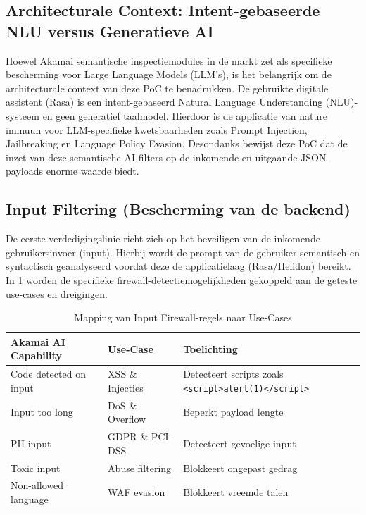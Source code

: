 \subsection{Architecturale Context: Intent-gebaseerde NLU versus Generatieve AI}

Hoewel Akamai semantische inspectiemodules in de markt zet als specifieke bescherming voor Large Language Models (LLM's), is het belangrijk om de architecturale context van deze PoC te benadrukken. De gebruikte digitale assistent (Rasa) is een intent-gebaseerd Natural Language Understanding (NLU)-systeem en geen generatief taalmodel. Hierdoor is de applicatie van nature immuun voor LLM-specifieke kwetsbaarheden zoals Prompt Injection, Jailbreaking en Language Policy Evasion. Desondanks bewijst deze PoC dat de inzet van deze semantische AI-filters op de inkomende en uitgaande JSON-payloads enorme waarde biedt.

\subsection{Input Filtering (Bescherming van de backend)}

De eerste verdedigingslinie richt zich op het beveiligen van de inkomende gebruikersinvoer (input). Hierbij wordt de prompt van de gebruiker semantisch en syntactisch geanalyseerd voordat deze de applicatielaag (Rasa/Helidon) bereikt. In \ref{tab:input_firewall} worden de specifieke firewall-detectiemogelijkheden gekoppeld aan de geteste use-cases en dreigingen.

\begin{table}[H]
    \centering
    \caption{Mapping van Input Firewall-regels naar Use-Cases}
    \label{tab:input_firewall}
    \begin{tabular}{|p{4cm}|p{4cm}|p{6cm}|}
        \hline
        Akamai AI Capability & Use-Case & Toelichting \\
        \hline
        Code detected on input & XSS \& Injecties & Detecteert scripts zoals \texttt{<script>alert(1)</script>} \\
        \hline
        Input too long & DoS \& Overflow & Beperkt payload lengte \\
        \hline
        PII input & GDPR \& PCI-DSS & Detecteert gevoelige input \\
        \hline
        Toxic input & Abuse filtering & Blokkeert ongepast gedrag \\
        \hline
        Non-allowed language & WAF evasion & Blokkeert vreemde talen \\
        \hline
    \end{tabular}
\end{table}

